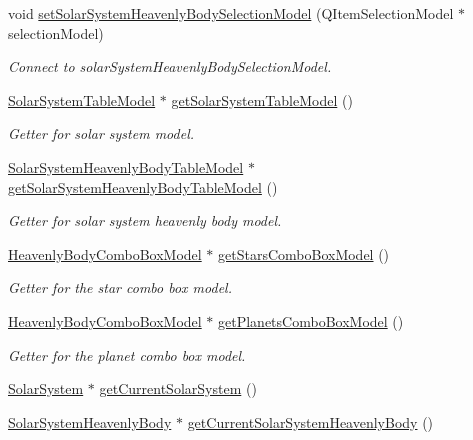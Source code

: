 \begin{DoxyCompactItemize}
void \hyperlink{classSolarSystemModel_a9541609daeebde3d067b6a6d9a13e629}{set\-Solar\-System\-Heavenly\-Body\-Selection\-Model} (\-Q\-Item\-Selection\-Model $\ast$selection\-Model)
\begin{DoxyCompactList}\small\item\em \-Connect to solar\-System\-Heavenly\-Body\-Selection\-Model. \end{DoxyCompactList}\item 
\hyperlink{classSolarSystemTableModel}{\-Solar\-System\-Table\-Model} $\ast$ \hyperlink{classSolarSystemModel_a251c5220ac938e8d44e0093606305dea}{get\-Solar\-System\-Table\-Model} ()
\begin{DoxyCompactList}\small\item\em \-Getter for solar system model. \end{DoxyCompactList}\item 
\hyperlink{classSolarSystemHeavenlyBodyTableModel}{\-Solar\-System\-Heavenly\-Body\-Table\-Model} $\ast$ \hyperlink{classSolarSystemModel_a8086ca6a1d7fa3696ffaa95297d9892d}{get\-Solar\-System\-Heavenly\-Body\-Table\-Model} ()
\begin{DoxyCompactList}\small\item\em \-Getter for solar system heavenly body model. \end{DoxyCompactList}\item 
\hyperlink{classHeavenlyBodyComboBoxModel}{\-Heavenly\-Body\-Combo\-Box\-Model} $\ast$ \hyperlink{classSolarSystemModel_a6e84376f02312034a70b4d93a93bc965}{get\-Stars\-Combo\-Box\-Model} ()
\begin{DoxyCompactList}\small\item\em \-Getter for the star combo box model. \end{DoxyCompactList}\item 
\hyperlink{classHeavenlyBodyComboBoxModel}{\-Heavenly\-Body\-Combo\-Box\-Model} $\ast$ \hyperlink{classSolarSystemModel_aa807bdf5d621b64ef8752349404737d5}{get\-Planets\-Combo\-Box\-Model} ()
\begin{DoxyCompactList}\small\item\em \-Getter for the planet combo box model. \end{DoxyCompactList}\item 
\hyperlink{classSolarSystem}{\-Solar\-System} $\ast$ \hyperlink{classSolarSystemModel_aae7435783e5bd0af7e155682fe21d5d6}{get\-Current\-Solar\-System} ()
\item 
\hyperlink{classSolarSystemHeavenlyBody}{\-Solar\-System\-Heavenly\-Body} $\ast$ \hyperlink{classSolarSystemModel_a13e9309b14644c5cff10ff6c893b5b79}{get\-Current\-Solar\-System\-Heavenly\-Body} ()

\end{DoxyCompactItemize}
